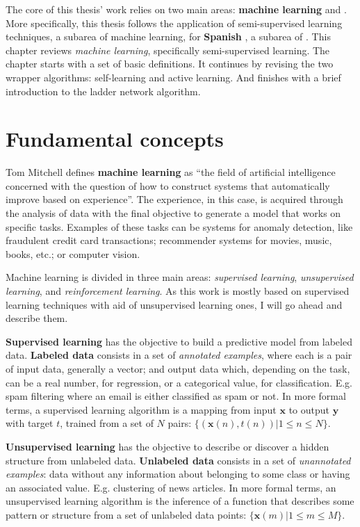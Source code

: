 The core of this thesis' work relies on two main areas: {\bf machine learning}
and {\bf \nlp}. More specifically, this thesis follows the application of
semi-supervised learning techniques, a subarea of machine learning, for {\bf
  Spanish \vsd}, a subarea of \nlp. This chapter reviews {\em machine
learning}, specifically semi-supervised learning. The chapter starts with a set
of basic definitions. It continues by revising the two wrapper algorithms:
self-learning and active learning. And finishes with a brief introduction to
the ladder network algorithm.

\section{Fundamental concepts}\label{sec:general_background:fundamental}

Tom Mitchell \cite{mitchell1997machine} defines {\bf machine learning} as ``the
field of artificial intelligence concerned with the question of how to
construct systems that automatically improve based on experience''. The
experience, in this case, is acquired through the analysis of data with the
final objective to generate a model that works on specific tasks. Examples of
these tasks can be systems for anomaly detection, like fraudulent credit card
transactions; recommender systems for movies, music, books, etc.; or computer
vision.

Machine learning is divided in three main areas: {\em supervised learning},
{\em unsupervised learning}, and {\em reinforcement learning}. As this work
is mostly based on supervised learning techniques with aid of unsupervised
learning ones, I will go ahead and describe them.

{\bf Supervised learning} has the objective to build a predictive model from
labeled data. {\bf Labeled data} consists in a set of {\em annotated examples},
where each is a pair of input data, generally a vector; and output data which,
depending on the task, can be a real number, for regression, or a categorical
value, for classification. E.g. spam filtering where an email is either
classified as spam or not. In more formal terms, a supervised learning
algorithm is a mapping from input $\mathbf{x}$ to output $\mathbf{y}$ with
target $t$, trained from a set of $N$ pairs: $\{(\textbf{x}(n), t(n)) | 1 \leq
n \leq N\}$.

{\bf Unsupervised learning} has the objective to describe or discover a hidden
structure from unlabeled data. {\bf Unlabeled data} consists in a set of {\em
unannotated examples}: data without any information about belonging to some
class or having an associated value. E.g. clustering of news articles. In more
formal terms, an unsupervised learning algorithm is the inference of a function
that describes some pattern or structure from a set of unlabeled data points:
$\{\textbf{x}(m) | 1 \leq m \leq M\}$.


